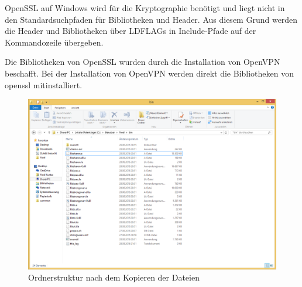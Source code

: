 {OpenSSL auf Windows wird für die Kryptographie benötigt und liegt nicht in den Standardsuchpfaden
für Bibliotheken und Header. Aus diesem Grund werden die Header und Bibliotheken
über LDFLAGs in Include-Pfade auf der Kommandozeile übergeben.

Die Bibliotheken von OpenSSL wurden durch die Installation von OpenVPN beschafft.
Bei der Installation von OpenVPN werden direkt die Bibliotheken von openssl mitinstalliert.

\begin{centering}
\begin{figure}
\includegraphics[width=\textwidth]{Bilder/Ordnerstruktur.png}
\caption{Ordnerstruktur nach dem Kopieren der Dateien}
\label{fig:Ordnerstruktur}
\end{figure}
\end{centering}

}
